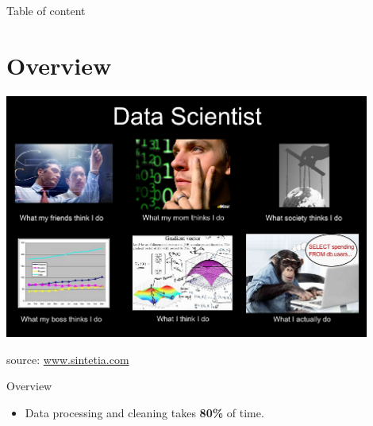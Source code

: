 \documentclass[unicode, notheorems]{beamer}
\begin{document}
\begin{frame}{Table of content}
  \tableofcontents
\end{frame}

\section{Overview}
\frame{\tableofcontents[currentsection]}

\begin{frame}
\begin{center}
\includegraphics[width=12cm]{./images/Data-Scientist-What-I-really-do}
\end{center}

{\footnotesize
source: \href{http://www.sintetia.com/wp-content/uploads/2014/05/Data-Scientist-What-I-really-do.png}{www.sintetia.com}
}
\end{frame}

\begin{frame}{Overview}
\begin{itemize}
\item Data processing and cleaning takes \textbf{80\%} of time.
\end{itemize}
\end{frame}
\end{document}
